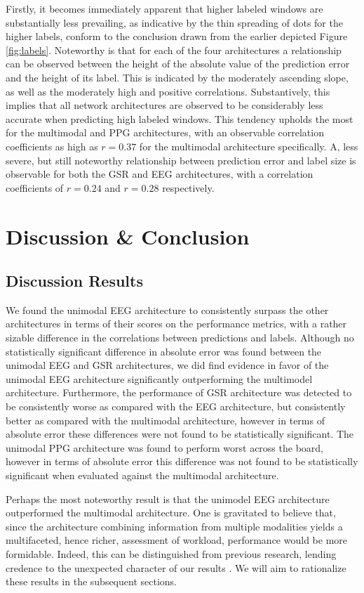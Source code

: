 \documentclass[12pt]{article}
\begin{document}
Firstly, it becomes immediately apparent that higher labeled windows are substantially less prevailing, as indicative by the thin spreading of dots for the higher labels, conform to the conclusion drawn from the earlier depicted Figure \ref{fig:labels}. Noteworthy is that for each of the four architectures a relationship can be observed between the height of the absolute value of the prediction error and the height of its label. This is indicated by the moderately ascending slope, as well as the moderately high and positive correlations. Substantively, this implies that all network architectures are observed to be considerably less accurate when predicting high labeled windows.  This tendency upholds the most for the multimodal and PPG architectures, with an observable correlation coefficients as high as $r=0.37$ for the multimodal architecture specifically.  A, less severe, but still noteworthy relationship between prediction error and label size is observable for both the GSR and EEG architectures,  with a correlation coefficients of $r=0.24$ and $r=0.28$ respectively.

\newpage
\section{Discussion \& Conclusion}
\subsection{Discussion Results}
We found the unimodal EEG architecture to consistently surpass the other architectures in terms of their scores on the performance metrics,  with a rather sizable difference in the correlations between predictions and labels.  Although no statistically significant difference in absolute error was found between the unimodal EEG and GSR architectures, we did find evidence in favor of the unimodal EEG architecture significantly outperforming the multimodel architecture. Furthermore, the performance of GSR architecture was detected to be consistently worse as compared with the EEG architecture, but consistently better as compared with the multimodal architecture, however in terms of absolute error these differences were not found to be statistically significant. The unimodal PPG architecture was found to perform worst across the board, however in terms of absolute error this difference was not found to be statistically significant when evaluated against the multimodal architecture.

Perhaps the most noteworthy result is that the unimodel EEG architecture outperformed the multimodal architecture. One is gravitated to believe that, since the architecture combining information from multiple modalities yields a multifaceted, hence richer, assessment of workload, performance would be more formidable. Indeed, this can be distinguished from previous research, lending credence to the unexpected character of our results \cite{dolmans2020perceived} \cite{han2020classification} \cite{rastgoo2019automatic} \cite{yin2017recognition}.  We will aim to rationalize these results in the subsequent sections.
\end{document}
